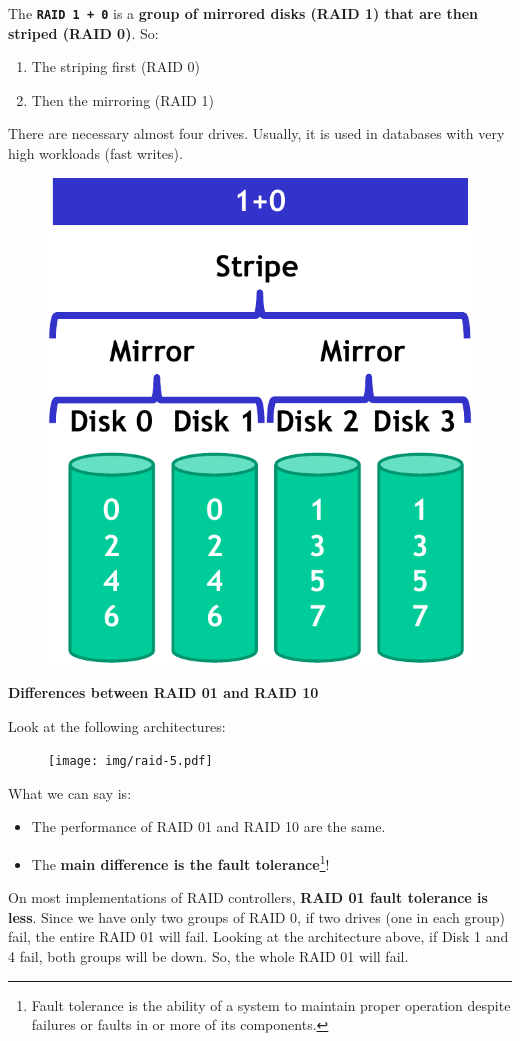 \label{RAID 1 + 0}\highspace
The \hypertarget{RAID 1 + 0}{\texttt{\textbf{RAID 1 + 0}}} is a \textbf{group of mirrored disks (RAID 1) that are then striped (RAID 0)}. So: 
\begin{enumerate}
    \item The striping first (RAID 0)
    \item Then the mirroring (RAID 1)
\end{enumerate}
There are necessary almost four drives. Usually, it is used in databases with very high workloads (fast writes).
\newpage
\begin{figure}[!htp]
    \centering
    \includegraphics[width=.5\textwidth]{img/raid-4.pdf}
\end{figure}

\highspace
\begin{flushleft}
    \textcolor{Green3}{ \textbf{Differences between RAID 01 and RAID 10}}
\end{flushleft}
Look at the following architectures:
\begin{figure}[!htp]
    \centering
    \texttt{[image: img/raid-5.pdf]}
\end{figure}

\noindent
What we can say is:
\begin{itemize}
    \item The performance of RAID 01 and RAID 10 are the same.
    \item The \textbf{main difference is the fault tolerance}\footnote{Fault tolerance is the ability of a system to maintain proper operation despite failures or faults in or more of its components.}!
\end{itemize}
On most implementations of RAID controllers, \textbf{RAID 01 fault tolerance is less}. Since we have only two groups of RAID 0, if two drives (one in each group) fail, the entire RAID 01 will fail. Looking at the architecture above, if Disk 1 and 4 fail, both groups will be down. So, the whole RAID 01 will fail.

